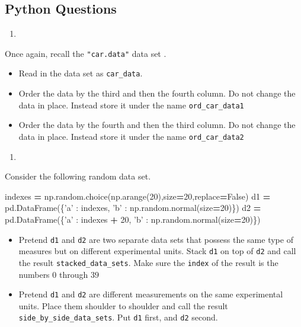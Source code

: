 \documentclass[12pt,krantz2]{krantz}
\makeatletter
\newenvironment{Shaded}{\begin{snugshade}}{\end{snugshade}}
\newcommand{\DecValTok}[1]{\textcolor[rgb]{0.06,0.06,0.06}{#1}}
\newcommand{\NormalTok}[1]{#1}
\newcommand{\OperatorTok}[1]{\textcolor[rgb]{0.43,0.43,0.43}{\textbf{#1}}}
\newcommand{\StringTok}[1]{\textcolor[rgb]{0.5,0.5,0.5}{#1}}
\newcommand{\VariableTok}[1]{\textcolor[rgb]{0,0,0}{#1}}
\providecommand{\tightlist}{%
  \setlength{\itemsep}{0pt}\setlength{\parskip}{0pt}}
\newenvironment{kframe}{%
\medskip{}
\setlength{\fboxsep}{.8em}
 \def\at@end@of@kframe{}%
 \ifinner\ifhmode%
  \def\at@end@of@kframe{\end{minipage}}%
  \begin{minipage}{\columnwidth}%
 \fi\fi%
 \def\FrameCommand##1{\hskip\@totalleftmargin \hskip-\fboxsep
 \colorbox{shadecolor}{##1}\hskip-\fboxsep
     \hskip-\linewidth \hskip-\@totalleftmargin \hskip\columnwidth}%
 \MakeFramed {\advance\hsize-\width
   \@totalleftmargin\z@ \linewidth\hsize
   \@setminipage}}%
 {\par\unskip\endMakeFramed%
 \at@end@of@kframe}
\renewenvironment{Shaded}{\begin{kframe}}{\end{kframe}}
\makeatother
\begin{document}
\hypertarget{python-questions-9}{%
\subsection{Python Questions}\label{python-questions-9}}

\begin{enumerate}
\def\labelenumi{\arabic{enumi}.}
\item
\end{enumerate}

Once again, recall the \texttt{"car.data"} data set \citep{misc_car_evaluation_19}.

\begin{itemize}
\tightlist
\item
  Read in the data set as \texttt{car\_data}.
\item
  Order the data by the third and then the fourth column. Do not change the data in place. Instead store it under the name \texttt{ord\_car\_data1}
\item
  Order the data by the fourth and then the third column. Do not change the data in place. Instead store it under the name \texttt{ord\_car\_data2}
\end{itemize}

\begin{enumerate}
\def\labelenumi{\arabic{enumi}.}
\setcounter{enumi}{1}
\item
\end{enumerate}

Consider the following random data set.

\begin{Shaded}
\begin{Highlighting}[]
\NormalTok{indexes  }\OperatorTok{=}\NormalTok{ np.random.choice(np.arange(}\DecValTok{20}\NormalTok{),size}\OperatorTok{=}\DecValTok{20}\NormalTok{,replace}\OperatorTok{=}\VariableTok{False}\NormalTok{)}
\NormalTok{d1 }\OperatorTok{=}\NormalTok{ pd.DataFrame(\{}\StringTok{'a'}\NormalTok{ : indexes, }
                        \StringTok{'b'}\NormalTok{ : np.random.normal(size}\OperatorTok{=}\DecValTok{20}\NormalTok{)\})}
\NormalTok{d2 }\OperatorTok{=}\NormalTok{ pd.DataFrame(\{}\StringTok{'a'}\NormalTok{ : indexes }\OperatorTok{+} \DecValTok{20}\NormalTok{, }
                        \StringTok{'b'}\NormalTok{ : np.random.normal(size}\OperatorTok{=}\DecValTok{20}\NormalTok{)\})}
\end{Highlighting}
\end{Shaded}

\begin{itemize}
\tightlist
\item
  Pretend \texttt{d1} and \texttt{d2} are two separate data sets that possess the same type of measures but on different experimental units. Stack \texttt{d1} on top of \texttt{d2} and call the result \texttt{stacked\_data\_sets}. Make sure the \texttt{index} of the result is the numbers \(0\) through \(39\)
\item
  Pretend \texttt{d1} and \texttt{d2} are different measurements on the same experimental units. Place them shoulder to shoulder and call the result \texttt{side\_by\_side\_data\_sets}. Put \texttt{d1} first, and \texttt{d2} second.
\end{itemize}
\end{document}
